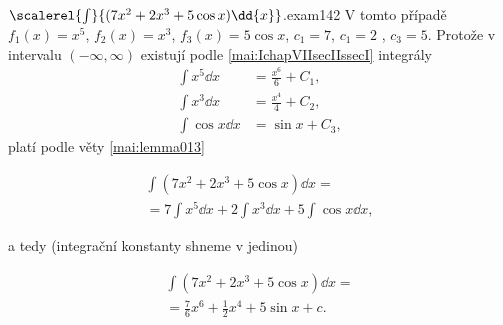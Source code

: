 \begin{mathexam}{\(\scalerel{\int}{(7x^2+2x^3+5\cos x)\dd{x}}\).}{exam142}
  V tomto případě \(f_1(x) = x^5\), \(f_2(x) = x^3\), \(f_3(x) = 5\cos x\), \(c_1=7\), \(c_1=2\) ,
  \(c_3=5\). Protože v intervalu \((-\infty, \infty)\) existují podle
  \eqref{mai:IchapVIIsecIIssecI} integrály
  \begin{align*}
    \int x^5\dd{x}   &= \frac{x^6}{6} + C_1, \\
    \int x^3\dd{x}   &= \frac{x^4}{4} + C_2, \\
    \int\cos x\dd{x} &= \sin x +C_3,
  \end{align*}
  platí podle věty \eqref{mai:lemma013} 
  \begin{fleqn}[0pt]
    \begin{multline*}
      \int(7x^2+2x^3+5\cos x)\dd{x} = \\
        = 7\int x^5\dd{x} + 2\int x^3\dd{x} + 5\int\cos x\dd{x},
    \end{multline*}
  \end{fleqn}
    a tedy (integrační konstanty shneme v jedinou)
    \begin{fleqn}[0pt]
      \begin{multline*}
        \int(7x^2+2x^3+5\cos x)\dd{x} = \\
          = \frac{7}{6}x^6 + \frac{1}{2}x^4 + 5\sin x + c.
      \end{multline*}
    \end{fleqn}
\end{mathexam}